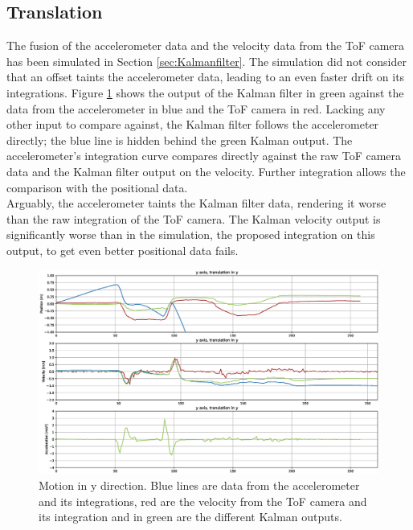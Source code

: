 \subsection{Translation}
\label{sec:kalman_translation_results}
The fusion of the accelerometer data and the velocity data from the ToF camera has been simulated in Section \ref{sec:Kalmanfilter}. The simulation did not consider that an offset taints the accelerometer data, leading to an even faster drift on its integrations. Figure \ref{im:meas_kalman_translation} shows the output of the Kalman filter in green against the data from the accelerometer in blue and the ToF camera in red. Lacking any other input to compare against, the Kalman filter follows the accelerometer directly; the blue line is hidden behind the green Kalman output. The accelerometer's integration curve compares directly against the raw ToF camera data and the Kalman filter output on the velocity. Further integration allows the comparison with the positional data.\\
Arguably, the accelerometer taints the Kalman filter data, rendering it worse than the raw integration of the ToF camera. The Kalman velocity output is significantly worse than in the simulation, the proposed integration on this output, to get even better positional data fails.
\begin{figure}[H]
  \centering
  \includegraphics[width=1.0\textwidth]{images/measurement_kalman_translation.eps}
  \caption{Motion in y direction. Blue lines are data from the accelerometer and its integrations, red are the velocity from the ToF camera and its integration and in green are the different Kalman outputs.}
  \label{im:meas_kalman_translation}
\end{figure} 
